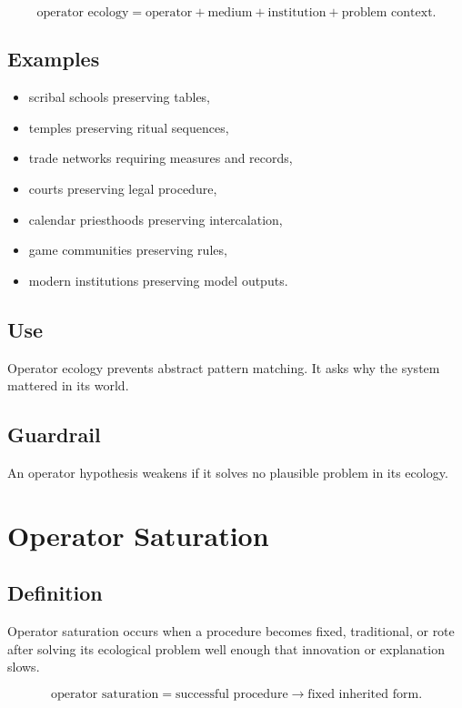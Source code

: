 \documentclass[11pt]{book}
\begin{document}
\[
\text{operator ecology} =
\text{operator} + \text{medium} + \text{institution} + \text{problem context}.
\]

\subsection*{Examples}

\begin{itemize}
    \item scribal schools preserving tables,
    \item temples preserving ritual sequences,
    \item trade networks requiring measures and records,
    \item courts preserving legal procedure,
    \item calendar priesthoods preserving intercalation,
    \item game communities preserving rules,
    \item modern institutions preserving model outputs.
\end{itemize}

\subsection*{Use}

Operator ecology prevents abstract pattern matching. It asks why the system mattered in its world.

\subsection*{Guardrail}

An operator hypothesis weakens if it solves no plausible problem in its ecology.

\section{Operator Saturation}

\subsection*{Definition}

Operator saturation occurs when a procedure becomes fixed, traditional, or rote after solving its ecological problem well enough that innovation or explanation slows.

\[
\text{operator saturation} =
\text{successful procedure} \rightarrow \text{fixed inherited form}.
\]
\end{document}
